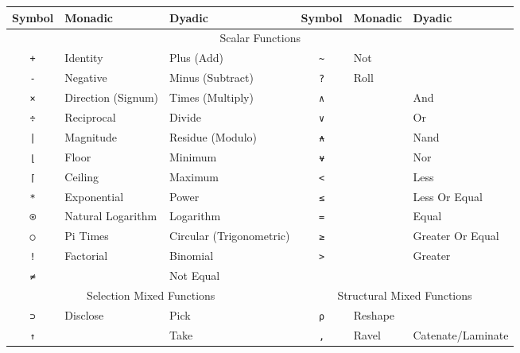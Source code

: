﻿\documentclass[numbers,10pt,preprint]{sigplanconf}
\begin{document}
\begin{table*}
\centering
\begin{tabular}{cllcll}
\toprule
Symbol                   & Monadic            & Dyadic  &
Symbol                   & Monadic            & Dyadic  \\
\midrule
\multicolumn{6}{c}{Scalar Functions} \\ 
\midrule
\texttt{+}               & Identity           & Plus (Add) &
\texttt{\textasciitilde} & Not                & \\
\texttt{-}               & Negative           & Minus (Subtract) &
\texttt{?}               & Roll               & \\
\texttt{×}               & Direction (Signum) & Times (Multiply) &
\texttt{∧}               &                    & And \\
\texttt{÷}               & Reciprocal         & Divide &
\texttt{∨}               &                    & Or \\
\texttt{|}               & Magnitude          & Residue (Modulo) &
\texttt{⍲}               &                    & Nand \\
\texttt{⌊}               & Floor              & Minimum &
\texttt{⍱}               &                    & Nor \\
\texttt{⌈}               & Ceiling            & Maximum &
\texttt{<}               &                    & Less \\
\texttt{*}               & Exponential        & Power &
\texttt{≤}               &                    & Less Or Equal \\
\texttt{⍟}               & Natural Logarithm  & Logarithm &
\texttt{=}               &                    & Equal \\
\texttt{○}               & Pi Times           & Circular (Trigonometric) &
\texttt{≥}               &                    & Greater Or Equal \\
\texttt{!}               & Factorial          & Binomial &
\texttt{>}               &                    & Greater \\
\texttt{≠}               &                    & Not Equal \\
\midrule
\multicolumn{3}{c}{Selection Mixed Functions} &
\multicolumn{3}{c}{Structural Mixed Functions} \\
\cmidrule(r){1-3} \cmidrule(l){4-6}
\texttt{⊃}               & Disclose & Pick &
\texttt{⍴} & Reshape       & \\
\texttt{↑}               &          & Take &
\texttt{,} & Ravel         & Catenate/Laminate \\

\end{tabular}
\end{table*}
\end{document}
